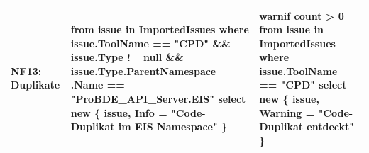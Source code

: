 \begin{longtable}{|>{\raggedright\arraybackslash}p{}|>{\raggedright\arraybackslash}p{}|>{\raggedright\arraybackslash}p{}|}
NF13: Duplikate &
{\ttfamily
from issue in ImportedIssues\newline
where issue.ToolName == "CPD" \newline
\quad \&\& issue.Type != null \newline
\quad \&\& issue.Type.ParentNamespace\newline
\quad \quad .Name == \newline
\quad \quad "ProBDE\_API\_Server.EIS"\newline
select new \{ issue, \newline
\quad Info = "Code-Duplikat im \newline
\quad \quad EIS Namespace" \}
}
&
{\ttfamily
warnif count > 0\newline
from issue in ImportedIssues\newline
where issue.ToolName == "CPD"\newline
select new \{ issue, \newline
\quad Warning = "Code-Duplikat \newline
\quad \quad entdeckt" \}
}
\\ \hline

\end{longtable}
\normalsize %